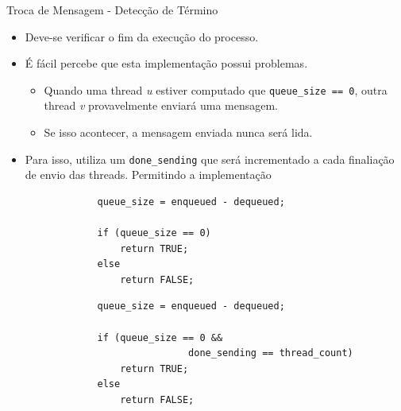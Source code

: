 	\begin{frame}[fragile]{Troca de Mensagem -  Detecção de Término}
		\begin{itemize}
			\item Deve-se verificar o fim da execução do processo.
		\end{itemize}


		\begin{multicols}{2}
			\begin{itemize}
				\item É fácil percebe que esta implementação possui problemas.
				\begin{itemize}
					\item Quando uma thread \textit{u} estiver computado que {\tt queue\_size == 0}, outra thread \textit{v} provavelmente enviará uma mensagem.
					\item Se isso acontecer, a mensagem enviada nunca será lida.
				\end{itemize}
				\item Para isso, utiliza um {\tt done\_sending} que será incrementado a cada finaliação de envio das threads. Permitindo a implementação
			\end{itemize}
		\columnbreak
			\begin{verbatim}
				queue_size = enqueued - dequeued; 

				if (queue_size == 0)
					return TRUE; 
				else 
					return FALSE;
			\end{verbatim}
					\pause
			\begin{verbatim}
				queue_size = enqueued - dequeued; 

				if (queue_size == 0 && 
								done_sending == thread_count)
					return TRUE; 
				else 
					return FALSE;
			\end{verbatim}
		\end{multicols}
\end{frame}


